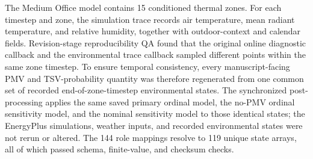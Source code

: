 The Medium Office model contains 15 conditioned thermal zones. For each timestep and zone, the simulation trace records air temperature, mean radiant temperature, and relative humidity, together with outdoor-context and calendar fields. Revision-stage reproducibility QA found that the original online diagnostic callback and the environmental trace callback sampled different points within the same zone timestep. To ensure temporal consistency, every manuscript-facing PMV and TSV-probability quantity was therefore regenerated from one common set of recorded end-of-zone-timestep environmental states. The synchronized post-processing applies the same saved primary ordinal model, the no-PMV ordinal sensitivity model, and the nominal sensitivity model to those identical states; the EnergyPlus simulations, weather inputs, and recorded environmental states were not rerun or altered. The 144 role mappings resolve to 119 unique state arrays, all of which passed schema, finite-value, and checksum checks.

